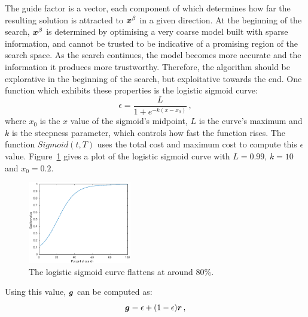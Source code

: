 The guide factor is a vector, each component of which determines how far the resulting solution is attracted to $\boldsymbol{x}^\beta$ in a given direction. At the beginning of the search, $\boldsymbol{x}^\beta$ is determined by optimising a very coarse model built with sparse information, and cannot be trusted to be indicative of a promising region of the search space. As the search continues, the model becomes more accurate and the information it produces more trustworthy. Therefore, the algorithm should be explorative in the beginning of the search, but exploitative towards the end. One function which exhibits these properties is the logistic sigmoid curve:
\begin{equation}
\epsilon = \dfrac{L}{1+e^{-k(x-x_0)}}\,,
\end{equation}
where $x_0$ is the $x$ value of the sigmoid's midpoint, $L$ is the curve's maximum and $k$ is the steepness parameter, which controls how fast the function rises. The function $Sigmoid(t,T)$ uses the total cost and maximum cost to compute this $\epsilon$ value. Figure~\ref{fig:logistic} gives a plot of the logistic sigmoid curve with $L=0.99$, $k=10$ and $x_0 = 0.2$. 
\begin{figure}[h!]
  \centering
  \includegraphics[width = 0.40\textwidth]{img/logistic.eps} 
  \caption{The logistic sigmoid curve flattens at around 80\%.} 
    \label{fig:logistic}
\end{figure}
Using this value, $\boldsymbol{g}$ can be computed as:
\begin{equation}
\boldsymbol{g} = \epsilon + (1-\epsilon)\boldsymbol{r}\,,
\end{equation}
